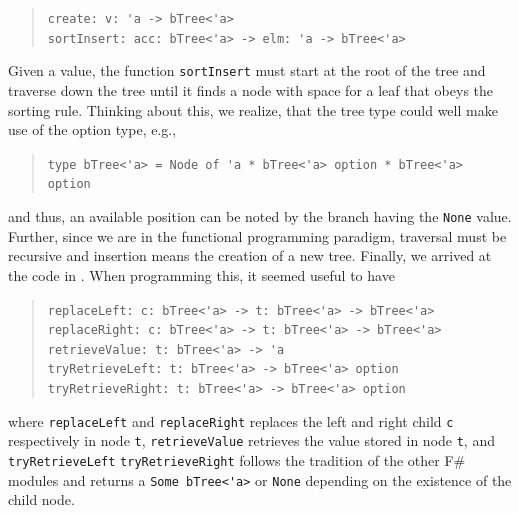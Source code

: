 \documentclass[fsharpNotes.tex]{subfiles}
\begin{document}
\begin{quote}
  \lstinline{create: v: 'a -> bTree<'a>}\\
  \lstinline{sortInsert: acc: bTree<'a> -> elm: 'a -> bTree<'a>}
\end{quote}
Given a value, the function \lstinline{sortInsert} must start at the root of the tree and traverse down the tree until it finds a node with space for a leaf that obeys the sorting rule. Thinking about this, we realize, that the tree type could well make use of the option type, e.g.,
\begin{quote}
  \lstinline{type bTree<'a> = Node of 'a * bTree<'a> option * bTree<'a> option}\\
\end{quote}
and thus, an available position can be noted by the branch having the \lstinline{None} value. Further, since we are in the functional programming paradigm, traversal must be recursive and insertion means the creation of a new tree. Finally, we arrived at the code in .
%
%
When programming this, it seemed useful to have
\begin{quote}
  \lstinline{replaceLeft: c: bTree<'a> -> t: bTree<'a> -> bTree<'a>}\\
  \lstinline{replaceRight: c: bTree<'a> -> t: bTree<'a> -> bTree<'a>}\\
  \lstinline{retrieveValue: t: bTree<'a> -> 'a}\\
  \lstinline{tryRetrieveLeft: t: bTree<'a> -> bTree<'a> option}\\
  \lstinline{tryRetrieveRight: t: bTree<'a> -> bTree<'a> option}
\end{quote}
where \lstinline{replaceLeft} and \lstinline{replaceRight} replaces the left and right child \lstinline{c} respectively in node \lstinline{t}, \lstinline{retrieveValue} retrieves the value stored in node \lstinline{t}, and \lstinline{tryRetrieveLeft} \lstinline{tryRetrieveRight} follows the tradition of the other F\# modules and returns a \lstinline{Some bTree<'a>} or \lstinline{None} depending on the existence of the child node.
\end{document}
